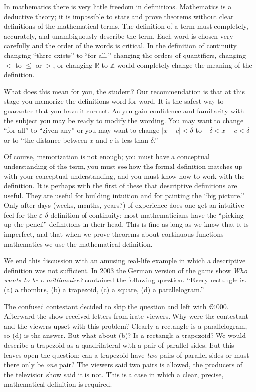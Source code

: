 In mathematics there is very little freedom in definitions. Mathematics is a deductive theory; it is impossible to state and prove theorems without clear definitions of the mathematical terms. The definition of a term must completely, accurately, and unambiguously describe the term. Each word is chosen very carefully and the order of the words is  critical. In the definition of continuity changing ``there exists'' to ``for all,'' changing the orders of quantifiers, changing $<$ to $\leq$ or $>$, or changing $\mathbb{R}$ to $\mathbb{Z}$ would completely change the meaning of the definition. 

What does this mean for you, the student? Our recommendation is that at this stage you memorize the definitions word-for-word. It is the safest way to guarantee that you have it correct. As you gain confidence and familiarity with the subject you may be ready to modify the wording. You may want to change ``for all'' to ``given any'' or you may want to change $|x-c|<\delta$ to $-\delta<x-c<\delta$ or to ``the distance between $x$ and $c$ is less than $\delta$.'' 

Of course, memorization is not enough; you must have a conceptual understanding of the term, you must see how the formal definition matches up with your conceptual understanding, and you must know how to work with the definition. It is perhaps with the first of these that descriptive definitions are useful. They are useful for building intuition and for painting the ``big picture.'' Only after days (weeks, months, years?) of experience does one get an intuitive feel for the $\varepsilon,\delta$-definition of continuity; most mathematicians have the ``picking-up-the-pencil'' definitions in their head. This is fine as long as we know that it is imperfect, and that when we prove theorems about continuous functions mathematics we use the mathematical definition. 

We end this discussion with an amusing real-life example in which a descriptive definition was not sufficient. In 2003 the German version of the game show \emph{Who wants to be a millionaire?} contained the following question: ``Every rectangle is: (a) a rhombus, (b) a trapezoid, (c) a square, (d) a parallelogram.'' 

The confused contestant decided to skip the question and left with \euro 4000. Afterward the show received letters from irate viewers. Why were the contestant and the viewers upset with this problem? Clearly a rectangle is a parallelogram, so (d) is the answer. But what about (b)? Is a rectangle a trapezoid? We would describe a trapezoid as a quadrilateral with a pair of parallel sides. But this leaves open the question: can a trapezoid have \emph{two} pairs of parallel sides or must there only be \emph{one} pair? The viewers said two pairs is allowed, the producers of the television show said it is not. This is a case in which a clear, precise, mathematical definition is required.